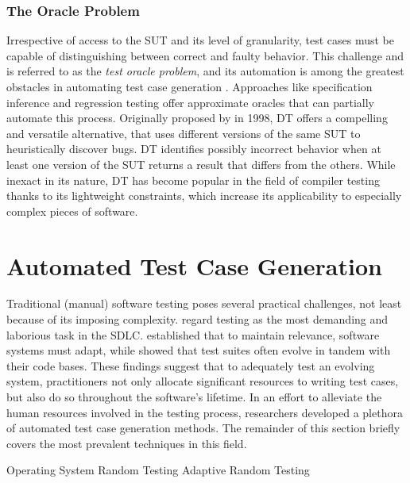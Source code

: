\subsubsection{The Oracle Problem}

Irrespective of access to the \gls{SUT}
and its level of granularity, test cases must be capable
of distinguishing between correct and faulty behavior.
This challenge and is referred to as the 
\textit{test oracle problem}, and its automation is among the 
greatest obstacles in automating test case generation \citep{barr2014oracle}.
Approaches like specification inference and regression testing offer
approximate oracles that can partially automate this process.
Originally proposed by \citet{mckeeman1998differential} in 1998, \Gls{DT}
offers a compelling and versatile alternative, that uses different versions
of the same \gls{SUT} to heuristically discover bugs.
\gls{DT} identifies possibly incorrect behavior when at least
one version of the \gls{SUT} returns a result that differs from the others.
While inexact in its nature, \gls{DT} has become popular
in the field of compiler testing thanks to its lightweight 
constraints, which increase its applicability to especially complex
pieces of software.

\section{Automated Test Case Generation}

Traditional (manual) software testing poses several practical
challenges, not least because of its imposing complexity.
\citet{candea2019automated} regard testing as the most
demanding and laborious task in the \gls{SDLC}.
\citet{lehman1979understanding} established that to maintain
relevance, software systems must adapt, while \citet{zaidman2011studying}
showed that test suites often evolve in tandem with their code bases.
These findings suggest that to adequately test an evolving system,
practitioners not only allocate significant resources to writing test cases,
but also do so throughout the software's lifetime.
In an effort to alleviate the human resources involved in the testing process,
researchers developed a plethora of automated test case generation methods.
The remainder of this section briefly covers the most prevalent techniques
in this field.

 {Operating System}
 {Random Testing}
 {Adaptive Random Testing}

